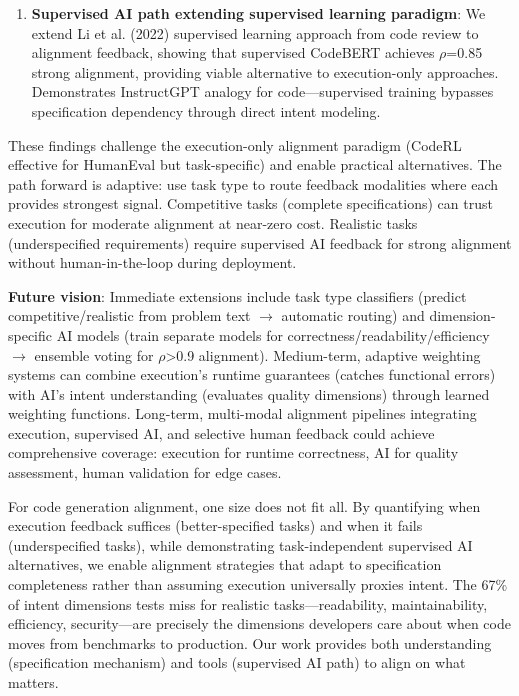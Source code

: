 \begin{enumerate}
\item \textbf{Supervised AI path extending supervised learning paradigm}: We extend Li et al. (2022) supervised learning approach from code review to alignment feedback, showing that supervised CodeBERT achieves $\rho$=0.85 strong alignment, providing viable alternative to execution-only approaches. Demonstrates InstructGPT analogy for code---supervised training bypasses specification dependency through direct intent modeling.
\end{enumerate}

These findings challenge the execution-only alignment paradigm (CodeRL effective for HumanEval but task-specific) and enable practical alternatives. The path forward is adaptive: use task type to route feedback modalities where each provides strongest signal. Competitive tasks (complete specifications) can trust execution for moderate alignment at near-zero cost. Realistic tasks (underspecified requirements) require supervised AI feedback for strong alignment without human-in-the-loop during deployment.

\textbf{Future vision}: Immediate extensions include task type classifiers (predict competitive/realistic from problem text $\rightarrow$ automatic routing) and dimension-specific AI models (train separate models for correctness/readability/efficiency $\rightarrow$ ensemble voting for $\rho$>0.9 alignment). Medium-term, adaptive weighting systems can combine execution's runtime guarantees (catches functional errors) with AI's intent understanding (evaluates quality dimensions) through learned weighting functions. Long-term, multi-modal alignment pipelines integrating execution, supervised AI, and selective human feedback could achieve comprehensive coverage: execution for runtime correctness, AI for quality assessment, human validation for edge cases.

For code generation alignment, one size does not fit all. By quantifying when execution feedback suffices (better-specified tasks) and when it fails (underspecified tasks), while demonstrating task-independent supervised AI alternatives, we enable alignment strategies that adapt to specification completeness rather than assuming execution universally proxies intent. The 67\% of intent dimensions tests miss for realistic tasks---readability, maintainability, efficiency, security---are precisely the dimensions developers care about when code moves from benchmarks to production. Our work provides both understanding (specification mechanism) and tools (supervised AI path) to align on what matters.
